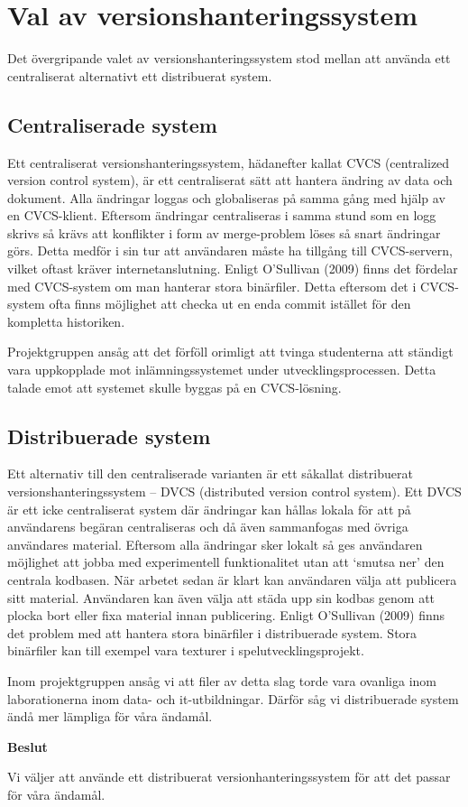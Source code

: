 \section{Val av versionshanteringssystem}

Det övergripande valet av versionshanteringssystem stod mellan att använda ett centraliserat alternativt ett distribuerat system.

\subsection{Centraliserade system}

Ett centraliserat versionshanteringssystem, hädanefter kallat CVCS (centralized version control system), är ett centraliserat sätt att hantera ändring av data och dokument. Alla ändringar loggas och globaliseras på samma gång med hjälp av en CVCS-klient. Eftersom ändringar centraliseras i samma stund som en logg skrivs så krävs att konflikter i form av merge-problem löses så snart ändringar görs. Detta medför i sin tur att användaren måste ha tillgång till CVCS-servern, vilket oftast kräver internetanslutning.
Enligt O’Sullivan (2009) finns det fördelar med CVCS-system om man hanterar stora binärfiler. Detta eftersom det i CVCS-system ofta finns möjlighet att checka ut en enda commit istället för den kompletta historiken.

Projektgruppen ansåg att det förföll orimligt att tvinga studenterna att ständigt vara uppkopplade mot inlämningssystemet under utvecklingsprocessen. Detta talade emot att systemet skulle byggas på en CVCS-lösning.

\subsection{Distribuerade system}

Ett alternativ till den centraliserade varianten är ett såkallat distribuerat versionshanteringssystem – DVCS (distributed version control system). 
Ett DVCS är ett icke centraliserat system där ändringar kan hållas lokala för att på användarens begäran centraliseras och då även sammanfogas med övriga användares material. Eftersom alla ändringar sker lokalt så ges användaren möjlighet att jobba med experimentell funktionalitet utan att `smutsa ner' den centrala kodbasen. När arbetet sedan är klart kan användaren välja att publicera sitt material. Användaren kan även välja att städa upp sin kodbas genom att  plocka bort eller fixa material innan publicering.
Enligt O’Sullivan (2009) finns det problem med att hantera stora binärfiler i distribuerade system. Stora binärfiler kan till exempel vara texturer i spelutvecklingsprojekt. 

Inom projektgruppen ansåg vi att filer av detta slag torde vara ovanliga inom laborationerna inom data- och it-utbildningar. Därför såg vi  distribuerade system ändå mer lämpliga för våra ändamål.
\begin{flushright}
  
  \textbf{Beslut}
  
  Vi väljer att använde ett distribuerat versionhanteringssystem för att det passar för våra ändamål.
  
\end{flushright}

